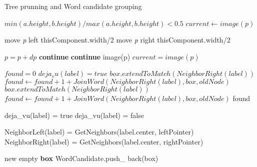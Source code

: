 \begin{algorithm}
\caption{Tree prunning and Word candidate grouping}\label{alg:WordCandidate}
\begin{algorithmic}[1]
\State \Return $min(a.height,b.height)/max(a.height,b.height)<0.5$
\EndProcedure
{}
\State $current \gets image(p)$

	\State move \textit{p} left thisComponent.width/2
\Else
	\State move \textit{p} right thisComponent.width/2
\EndIf

\State $p=p+dp$
 \textbf{continue} \EndIf
{} \textbf{continue} \EndIf
{}
	\State \Return image(p)
\Else
	\State $current = image(p)$
\EndIf
\EndFor
\State {}
\EndProcedure
\item[]
\item[]
	\State $found = 0$
	\State $deja_vu(label)= true$	
		\State $box.extendToMatch(NeighborRight(label))$
		\State $found \gets found + 1 + JoinWord(NeighborRight(label),box,oldNode)$
	\EndIf
		\State $box.extendToMatch(NeighborRight(label))$
		\State $found \gets found + 1 + JoinWord(NeighborRight(label),box,oldNode)$	
	\EndIf
	\State \Return found
\EndFunction
\item[]
\item[]
		\State	deja\_vu(label) = true
	\Else
		\State	deja\_vu(label) = false
	\EndIf
\EndFor

	\State NeighborLeft(label) = GetNeighbors(label.center, leftPointer)
	\State NeighborRight(label) = GetNeighbors(label.center, rightPointer)
\EndFor

	\State new empty \textbf{box}
		WordCandidate.push\_ back(box)
	\EndIf
\EndFor

\EndProcedure
\end{algorithmic}

\end{algorithm}

